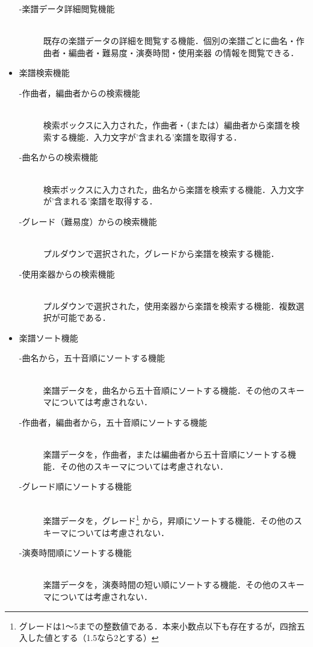 \documentclass[11pt]{jsreport}
\begin{document}
\begin{itemize}
\begin{description}
        \item[-楽譜データ詳細閲覧機能] \mbox{}\\
            既存の楽譜データの詳細を閲覧する機能．個別の楽譜ごとに曲名・作曲者・編曲者・難易度・演奏時間・使用楽器
            の情報を閲覧できる．
    \end{description}
    \item 楽譜検索機能
    \begin{description}
        \item[-作曲者，編曲者からの検索機能]\mbox{}\\
            検索ボックスに入力された，作曲者・（または）編曲者から楽譜を検索する機能．入力文字が'含まれる'楽譜を取得する．
        \item[-曲名からの検索機能] \mbox{}\\
            検索ボックスに入力された，曲名から楽譜を検索する機能．入力文字が'含まれる'楽譜を取得する．
        \item[-グレード（難易度）からの検索機能] \mbox{}\\
            プルダウンで選択された，グレードから楽譜を検索する機能．
        \item[-使用楽器からの検索機能] \mbox{}\\
            プルダウンで選択された，使用楽器から楽譜を検索する機能．複数選択が可能である．
    \end{description}
    \item 楽譜ソート機能
    \begin{description}
        \item[-曲名から，五十音順にソートする機能]\mbox{}\\
            楽譜データを，曲名から五十音順にソートする機能．その他のスキーマについては考慮されない．
        \item[-作曲者，編曲者から，五十音順にソートする機能] \mbox{}\\
            楽譜データを，作曲者，または編曲者から五十音順にソートする機能．その他のスキーマについては考慮されない．
        \item[-グレード順にソートする機能] \mbox{}\\
            楽譜データを，グレード\footnote{グレードは1〜5までの整数値である．本来小数点以下も存在するが，四捨五入した値とする（1.5なら2とする）}
            から，昇順にソートする機能．その他のスキーマについては考慮されない．
        \item[-演奏時間順にソートする機能] \mbox{}\\
            楽譜データを，演奏時間の短い順にソートする機能．その他のスキーマについては考慮されない．

\end{description}
\end{itemize}
\end{document}

